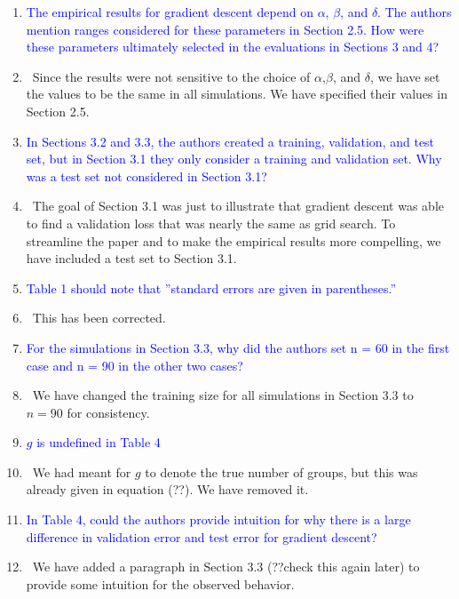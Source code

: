 \documentclass[]{article}
\newcommand{\point}[1]{\item \textcolor{blue}{#1}}
\newcommand{\reply}{\item[]\ }
\begin{document}
\begin{enumerate}
		\point{The empirical results for gradient descent depend on $\alpha$, $\beta$, and $\delta$. The authors mention ranges considered for these parameters in Section 2.5. How were these parameters ultimately selected in the evaluations in Sections 3 and 4?}
		
		\reply Since the results were not sensitive to the choice of $\alpha$,$\beta$, and $\delta$, we have set the values to be the same in all simulations. We have specified their values in Section 2.5.
		
		\point{In Sections 3.2 and 3.3, the authors created a training, validation, and test set, but in Section 3.1 they only consider a training and validation set. Why was a test set not considered in Section 3.1?}
		
		\reply The goal of Section 3.1 was just to illustrate that gradient descent was able to find a validation loss that was nearly the same as grid search. To streamline the paper and to make the empirical results more compelling, we have included a test set to Section 3.1.
		
		\point{Table 1 should note that ”standard errors are given in parentheses.”}
		
		\reply This has been corrected.
		
		\point{For the simulations in Section 3.3, why did the authors set n = 60 in the first case and
n = 90 in the other two cases?}
		
		\reply We have changed the training size for all simulations in Section 3.3 to $n=90$ for consistency.
		
		\point{$g$ is undefined in Table 4}
		
		\reply We had meant for $g$ to denote the true number of groups, but this was already given in equation (??). We have removed it.
		
		\point{In Table 4, could the authors provide intuition for why there is a large difference in validation error and test error for gradient descent?}
		
		\reply We have added a paragraph in Section 3.3 (??check this again later) to provide some intuition for the observed behavior.
	\end{enumerate} 
	
\end{document}
